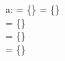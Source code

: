 \documentclass{article}
\begin{document}
\begin{axdef}
 a: \nat \pfun \nat
 \where
\emptyset[\nat] = \{\}  
\emptyset[\power \nat] = \{\}  \\
\emptyset[\nat \rel \nat] = \{\}  \\
\emptyset[\nat \fun \nat] = \{\}  \\
\emptyset[\nat \fun (\nat \pfun \nat)] = \{\} \\



\end{axdef} 
\end{document}
